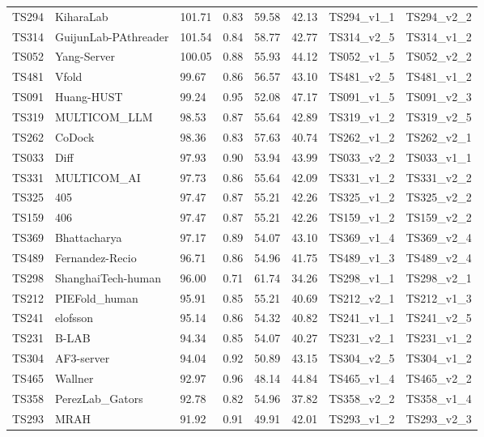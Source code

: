 \begin{table}[ht]
{\begin{tabular}{llllllll}
TS294 & KiharaLab & 101.71 & 0.83 & 59.58 & 42.13 & TS294\_v1\_1 & TS294\_v2\_2 \\ 
TS314 & GuijunLab-PAthreader & 101.54 & 0.84 & 58.77 & 42.77 & TS314\_v2\_5 & TS314\_v1\_2 \\ 
TS052 & Yang-Server & 100.05 & 0.88 & 55.93 & 44.12 & TS052\_v1\_5 & TS052\_v2\_2 \\ 
TS481 & Vfold & 99.67 & 0.86 & 56.57 & 43.10 & TS481\_v2\_5 & TS481\_v1\_2 \\ 
TS091 & Huang-HUST & 99.24 & 0.95 & 52.08 & 47.17 & TS091\_v1\_5 & TS091\_v2\_3 \\ 
TS319 & MULTICOM\_LLM & 98.53 & 0.87 & 55.64 & 42.89 & TS319\_v1\_2 & TS319\_v2\_5 \\ 
TS262 & CoDock & 98.36 & 0.83 & 57.63 & 40.74 & TS262\_v1\_2 & TS262\_v2\_1 \\ 
TS033 & Diff & 97.93 & 0.90 & 53.94 & 43.99 & TS033\_v2\_2 & TS033\_v1\_1 \\ 
TS331 & MULTICOM\_AI & 97.73 & 0.86 & 55.64 & 42.09 & TS331\_v1\_2 & TS331\_v2\_2 \\ 
TS325 & 405 & 97.47 & 0.87 & 55.21 & 42.26 & TS325\_v1\_2 & TS325\_v2\_2 \\ 
TS159 & 406 & 97.47 & 0.87 & 55.21 & 42.26 & TS159\_v1\_2 & TS159\_v2\_2 \\ 
TS369 & Bhattacharya & 97.17 & 0.89 & 54.07 & 43.10 & TS369\_v1\_4 & TS369\_v2\_4 \\ 
TS489 & Fernandez-Recio & 96.71 & 0.86 & 54.96 & 41.75 & TS489\_v1\_3 & TS489\_v2\_4 \\ 
TS298 & ShanghaiTech-human & 96.00 & 0.71 & 61.74 & 34.26 & TS298\_v1\_1 & TS298\_v2\_1 \\ 
TS212 & PIEFold\_human & 95.91 & 0.85 & 55.21 & 40.69 & TS212\_v2\_1 & TS212\_v1\_3 \\ 
TS241 & elofsson & 95.14 & 0.86 & 54.32 & 40.82 & TS241\_v1\_1 & TS241\_v2\_5 \\ 
TS231 & B-LAB & 94.34 & 0.85 & 54.07 & 40.27 & TS231\_v2\_1 & TS231\_v1\_2 \\ 
TS304 & AF3-server & 94.04 & 0.92 & 50.89 & 43.15 & TS304\_v2\_5 & TS304\_v1\_2 \\ 
TS465 & Wallner & 92.97 & 0.96 & 48.14 & 44.84 & TS465\_v1\_4 & TS465\_v2\_2 \\ 
TS358 & PerezLab\_Gators & 92.78 & 0.82 & 54.96 & 37.82 & TS358\_v2\_2 & TS358\_v1\_4 \\ 
TS293 & MRAH & 91.92 & 0.91 & 49.91 & 42.01 & TS293\_v1\_2 & TS293\_v2\_3 \\ 

\end{tabular}}
\end{table}
